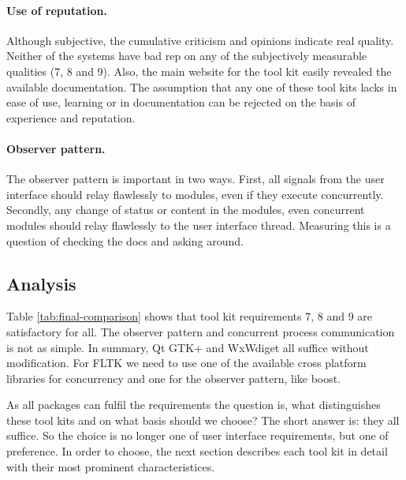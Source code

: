 \paragraph{Use of reputation.} Although subjective, the cumulative criticism and opinions
indicate real quality. Neither of the systems have bad rep on any
of the subjectively measurable qualities (7, 8 and 9). Also, the main website for
the tool kit easily revealed the available documentation. The assumption that any one 
of these tool kits lacks in ease of use, learning or in documentation can be rejected on
the basis of experience and reputation. 

\paragraph{Observer pattern.} The observer pattern is important in two ways.
First, all signals from the user interface should relay flawlessly to modules, even if
they execute concurrently. Secondly, any change of status or content in the modules,
even concurrent modules should relay flawlessly to the user interface thread. Measuring
this is a question of checking the docs and asking around. 


\subsection{Analysis}

Table \ref{tab:final-comparison} shows that tool kit requirements 7, 8 and 9 are satisfactory for
all. The observer pattern and concurrent process communication is not as simple. In summary, Qt
GTK+ and WxWdiget all suffice without modification. For FLTK we need to use one of the
available cross platform libraries for concurrency and one for the observer pattern, like boost.

As all packages can fulfil the requirements the question is, what distinguishes these tool kits
and on what basis should we choose? The short answer is: they all suffice. So the choice is no
longer one of user interface requirements, but one of preference. In order to choose, the next
section describes each tool kit in detail with their most prominent characteristices.

